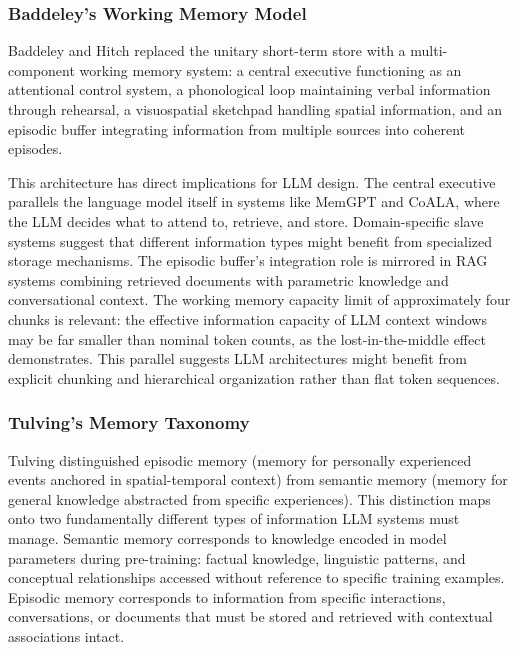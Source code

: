 \documentclass[11pt,letterpaper]{article}
\begin{document}
\subsubsection{Baddeley's Working Memory Model}

Baddeley and Hitch \cite{baddeley1974working} replaced the unitary short-term store with a multi-component working memory system: a central executive functioning as an attentional control system, a phonological loop maintaining verbal information through rehearsal, a visuospatial sketchpad handling spatial information, and an episodic buffer \cite{baddeley2000episodic} integrating information from multiple sources into coherent episodes.

This architecture has direct implications for LLM design. The central executive parallels the language model itself in systems like MemGPT and CoALA, where the LLM decides what to attend to, retrieve, and store. Domain-specific slave systems suggest that different information types might benefit from specialized storage mechanisms. The episodic buffer's integration role is mirrored in RAG systems combining retrieved documents with parametric knowledge and conversational context. The working memory capacity limit of approximately four chunks is relevant: the effective information capacity of LLM context windows may be far smaller than nominal token counts, as the lost-in-the-middle effect demonstrates. This parallel suggests LLM architectures might benefit from explicit chunking and hierarchical organization rather than flat token sequences.

\subsubsection{Tulving's Memory Taxonomy}

Tulving \cite{tulving1972episodic, tulving1985memory} distinguished episodic memory (memory for personally experienced events anchored in spatial-temporal context) from semantic memory (memory for general knowledge abstracted from specific experiences). This distinction maps onto two fundamentally different types of information LLM systems must manage. Semantic memory corresponds to knowledge encoded in model parameters during pre-training: factual knowledge, linguistic patterns, and conceptual relationships accessed without reference to specific training examples. Episodic memory corresponds to information from specific interactions, conversations, or documents that must be stored and retrieved with contextual associations intact.
\end{document}
